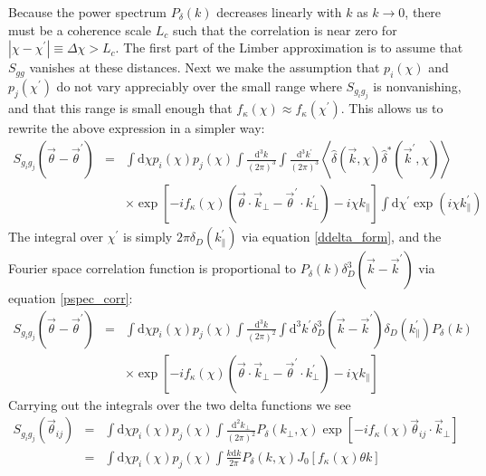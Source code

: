 \documentclass[12pt,preprint]{aastex}			%
\newcommand{\rcom}{\chi}
\newcommand{\dd}{\mathrm{d}}
\begin{document}
Because the power spectrum $P_\delta(k)$ decreases linearly with $k$ as 
$k\to0$, there must be a coherence scale $L_c$ such that the
correlation is near zero for 
$|\rcom-\rcom^\prime| \equiv \Delta\rcom > L_c$.  
The first part of the Limber approximation is to assume that $S_{gg}$ vanishes
at these distances.
Next we make the assumption that $p_i(\rcom)$ and 
$p_j(\rcom^\prime)$ do not vary appreciably over the small range where
$S_{g_ig_j}$ is nonvanishing, and that this range is small enough that 
$f_\kappa(\rcom) \approx f_\kappa(\rcom^\prime)$. 
This allows us to rewrite the above expression in a simpler way:
\begin{eqnarray}
  S_{g_ig_j}(\vec\theta-\vec\theta^\prime) 
  &=& \int \dd\rcom p_i(\rcom)p_j(\rcom)
  \int \frac{\dd^3k}{(2\pi)^3}\int \frac{\dd^3k^\prime}{(2\pi)^3} 
  \left\langle\hat\delta(\vec k,\rcom)
  \hat\delta^*(\vec k^\prime, \rcom)
  \right\rangle\nonumber\\
  &&\times
  \exp\left[-i f_\kappa(\rcom) 
    \left(\vec{\theta} \cdot \vec k_\perp 
    - \vec{\theta}^\prime \cdot k^\prime_\perp \right) 
    -i \rcom k_\parallel \right]
  \int \dd\rcom^\prime\exp\left(i\rcom k^\prime_\parallel\right)
\end{eqnarray}
The integral over $\rcom^\prime$ is 
simply $2\pi\delta_D(k^\prime_\parallel)$
via equation \ref{ddelta_form}, and the Fourier space correlation function
is proportional to $P_\delta(k)\delta^3_D(\vec k-\vec k^\prime)$ 
via equation \ref{pspec_corr}:
\begin{eqnarray}
  S_{g_ig_j}(\vec\theta-\vec\theta^\prime) 
  &=& \int \dd\rcom p_i(\rcom)p_j(\rcom)
  \int \frac{\dd^3k}{(2\pi)^2}\int \dd^3k^\prime
  \delta_D^3(\vec k-\vec k^\prime)\delta_D(k_\parallel^\prime)P_\delta(k)\nonumber\\
  &&\times
  \exp\left[-i f_\kappa(\rcom) 
    \left(\vec{\theta} \cdot \vec k_\perp 
    - \vec{\theta}^\prime \cdot k^\prime_\perp \right) 
    -i \rcom k_\parallel \right]
\end{eqnarray}
Carrying out the integrals over the two delta functions we see
\begin{eqnarray}
  \label{Limber}
  S_{g_ig_j}(\vec\theta_{ij}) 
  &=& \int \dd\rcom p_i(\rcom)p_j(\rcom)
  \int \frac{\dd^2k_\perp}{(2\pi)^2}
  P_\delta(k_\perp,\rcom)
  \exp\left[-i f_\kappa(\rcom) 
    \vec \theta_{ij} \cdot \vec k_\perp 
    \right]\\
  \label{Limber2}
  &=& \int \dd\rcom p_i(\rcom)p_j(\rcom)
  \int \frac{k\dd k}{2\pi}P_\delta(k,\rcom)
  J_0\left[f_\kappa(\rcom)\theta k\right]
\end{eqnarray}
\end{document}

